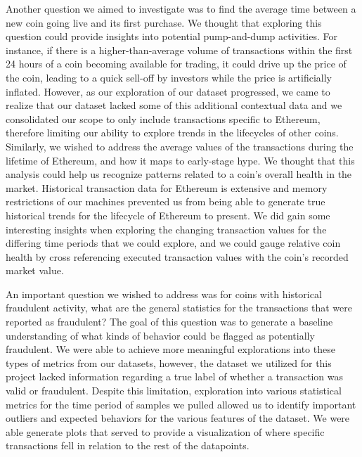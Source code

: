 \documentclass[sigconf]{acmart}
\begin{document}
Another question we aimed to investigate was to find the average time between a new coin going live and its first purchase. We thought that exploring this question could provide insights into potential pump-and-dump activities. For instance, if there is a higher-than-average volume of transactions within the first 24 hours of a coin becoming available for trading, it could drive up the price of the coin, leading to a quick sell-off by investors while the price is artificially inflated. However, as our exploration of our dataset progressed, we came to realize that our dataset lacked some of this additional contextual data and we consolidated our scope to only include transactions specific to Ethereum, therefore limiting our ability to explore trends in the lifecycles of other coins. Similarly, we wished to address the average values of the transactions during the lifetime of Ethereum, and how it maps to early-stage hype. We thought that this analysis could help us recognize patterns related to a coin’s overall health in the market. Historical transaction data for Ethereum is extensive and memory restrictions of our machines prevented us from being able to generate true historical trends for the lifecycle of Ethereum to present. We did gain some interesting insights when exploring the changing transaction values for the differing time periods that we could explore, and we could gauge relative coin health by cross referencing executed transaction values with the coin’s recorded market value. 

An important question we wished to address was for coins with historical fraudulent activity, what are the general statistics for the transactions that were reported as fraudulent? The goal of this question was to generate a baseline understanding of what kinds of behavior could be flagged as potentially fraudulent. We were able to achieve more meaningful explorations into these types of metrics from our datasets, however, the dataset we utilized for this project lacked information regarding a true label of whether a transaction was valid or fraudulent. Despite this limitation, exploration into various statistical metrics for the time period of samples we pulled allowed us to identify important outliers and expected behaviors for the various features of the dataset. We were able generate plots that served to provide a visualization of where specific transactions fell in relation to the rest of the datapoints.  
\end{document}
